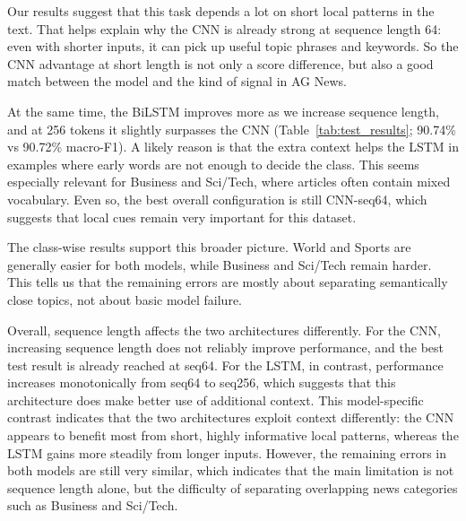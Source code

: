 Our results suggest that this task depends a lot on short local patterns in the text. That helps explain why the CNN is already strong at sequence length 64: even with shorter inputs, it can pick up useful topic phrases and keywords. So the CNN advantage at short length is not only a score difference, but also a good match between the model and the kind of signal in AG News.

At the same time, the BiLSTM improves more as we increase sequence length, and at 256 tokens it slightly surpasses the CNN (Table~\ref{tab:test_results}; 90.74\% vs 90.72\% macro-F1). A likely reason is that the extra context helps the LSTM in examples where early words are not enough to decide the class. This seems especially relevant for Business and Sci/Tech, where articles often contain mixed vocabulary. Even so, the best overall configuration is still CNN-seq64, which suggests that local cues remain very important for this dataset.

The class-wise results support this broader picture. World and Sports are generally easier for both models, while Business and Sci/Tech remain harder. This tells us that the remaining errors are mostly about separating semantically close topics, not about basic model failure.

Overall, sequence length affects the two architectures differently. For the CNN, increasing sequence length does not reliably improve performance, and the best test result is already reached at seq64. For the LSTM, in contrast, performance increases monotonically from seq64 to seq256, which suggests that this architecture does make better use of additional context. This model-specific contrast indicates that the two architectures exploit context differently: the CNN appears to benefit most from short, highly informative local patterns, whereas the LSTM gains more steadily from longer inputs. However, the remaining errors in both models are still very similar, which indicates that the main limitation is not sequence length alone, but the difficulty of separating overlapping news categories such as Business and Sci/Tech.

